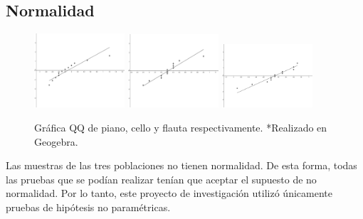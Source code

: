 \subsection{Normalidad}
\begin{center}
    \begin{figure}[H]
        \centering
        \includegraphics[width=0.3\textwidth]{./appendages/NP.png}
        \includegraphics[width=0.3\textwidth]{./appendages/NC.png}
        \includegraphics[width=0.3\textwidth]{./appendages/NF.png}
        \caption{Gráfica QQ de piano, cello y flauta respectivamente. *Realizado en Geogebra.}
    \end{figure}
\end{center}

Las muestras de las tres poblaciones no tienen normalidad. De esta forma, todas las pruebas que se podían realizar tenían que aceptar el supuesto de no normalidad. Por lo tanto, este proyecto de investigación utilizó únicamente pruebas de hipótesis no paramétricas.

